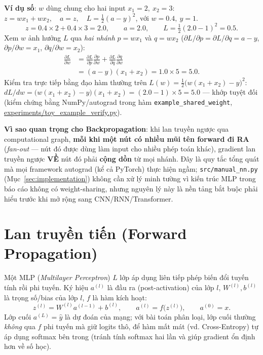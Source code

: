 \documentclass[12pt,a4paper]{report}
\newcommand{\en}[1]{\textit{#1}}
\begin{document}
\textbf{Ví dụ số}: $w$ dùng chung cho hai input $x_1=2,\ x_2=3$:
$z = w x_1 + w x_2,\quad a=z,\quad L=\tfrac12(a-y)^2$, với $w=0.4,\ y=1$.
$$z = 0.4\times2 + 0.4\times3 = 2.0,\qquad a=2.0,\qquad L=\tfrac12(2.0-1)^2=0.5.$$
Xem $w$ ảnh hưởng $L$ qua \emph{hai nhánh} $p=wx_1$ và $q=wx_2$
($\partial L/\partial p=\partial L/\partial q=a-y$, $\partial p/\partial w=x_1$,
$\partial q/\partial w=x_2$):
\begin{align*}
\frac{\partial L}{\partial w} &= \frac{\partial L}{\partial p}\frac{\partial p}{\partial w} + \frac{\partial L}{\partial q}\frac{\partial q}{\partial w}\\
&= (a-y)(x_1+x_2) = 1.0\times5 = 5.0.
\end{align*}
Kiểm tra trực tiếp bằng đạo hàm thường trên $L(w)=\tfrac12\big(w(x_1{+}x_2)-y\big)^2$:
$dL/dw = \big(w(x_1{+}x_2)-y\big)(x_1{+}x_2) = (2.0-1)\times5=5.0$ --- khớp
tuyệt đối (kiểm chứng bằng NumPy/autograd trong hàm
\texttt{example\_shared\_weight}, \url{experiments/toy_example_verify.py}).

\textbf{Vì sao quan trọng cho Backpropagation}: khi lan truyền ngược qua
computational graph, \textbf{mỗi khi một nút có nhiều mũi tên forward đi
RA} (\en{fan-out} --- nút đó được dùng làm input cho nhiều phép toán
khác), gradient lan truyền ngược \textbf{VỀ} nút đó phải \textbf{cộng dồn}
từ mọi nhánh. Đây là quy tắc tổng quát mà mọi framework autograd (kể cả
PyTorch) thực hiện ngầm; \texttt{src/manual\_nn.py} (Mục~\ref{sec:implementation})
không cần xử lý minh tường vì kiến trúc MLP trong báo cáo không có
weight-sharing, nhưng nguyên lý này là nền tảng bắt buộc phải hiểu trước
khi mở rộng sang CNN/RNN/Transformer.

\section{Lan truyền tiến (Forward Propagation)}
\label{sec:forward}

Một MLP (\en{Multilayer Perceptron}) $L$ lớp áp dụng liên tiếp phép biến
đổi tuyến tính rồi phi tuyến. Ký hiệu $a^{(l)}$ là đầu ra (post-activation)
của lớp $l$, $W^{(l)},b^{(l)}$ là trọng số/bias của lớp $l$, $f$ là hàm
kích hoạt:
$$z^{(l)} = W^{(l)}a^{(l-1)} + b^{(l)}, \qquad a^{(l)} = f\big(z^{(l)}\big), \qquad a^{(0)}=x.$$
Lớp cuối $a^{(L)}=\hat y$ là dự đoán của mạng; với bài toán phân loại, lớp
cuối thường \emph{không} qua $f$ phi tuyến mà giữ logits thô, để hàm mất
mát (vd. Cross-Entropy) tự áp dụng softmax bên trong (tránh tính softmax
hai lần và giúp gradient ổn định hơn về số học).
\end{document}
